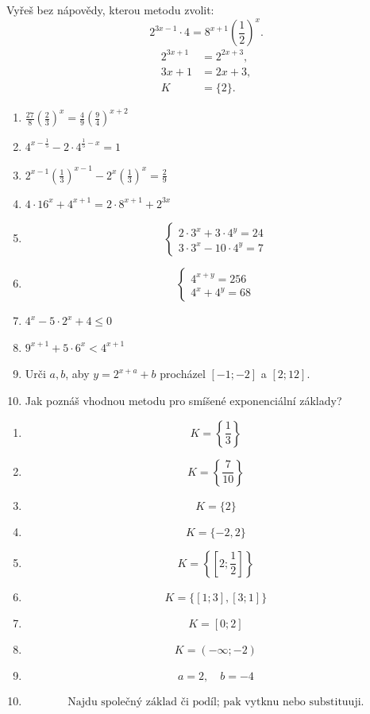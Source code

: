 \documentclass[11pt,a4paper]{article}
\begin{document}
\begin{prikladReseniBox}[title={Příklad 5}]
Vyřeš bez nápovědy, kterou metodu zvolit:
\[
2^{3x-1}\cdot4=8^{x+1}\left(\frac{1}{2}\right)^x.
\]
\tcblower
\[
\begin{aligned}2^{3x+1}&=2^{2x+3},\\3x+1&=2x+3,\\K&=\{2\}.\end{aligned}\]
\end{prikladReseniBox}

\begin{zadaniReseniBox}[title={Samostatná práce 1}]
\begin{enumerate}[label=\alph*)]
\item $\frac{27}{8}\left(\frac{2}{3}\right)^x=\frac{4}{9}\left(\frac{9}{4}\right)^{x+2}$
\item $4^{x-\frac{1}{5}}-2\cdot4^{\frac{1}{5}-x}=1$
\item $2^{x-1}\left(\frac{1}{3}\right)^{x-1}-2^x\left(\frac{1}{3}\right)^x=\frac{2}{9}$
\item $4\cdot16^x+4^{x+1}=2\cdot8^{x+1}+2^{3x}$
\item \[
\begin{cases}2\cdot3^x+3\cdot4^y=24\\3\cdot3^x-10\cdot4^y=7\end{cases}
\]
\item \[\begin{cases}4^{x+y}=256\\4^x+4^y=68\end{cases}\]
\item $4^x-5\cdot2^x+4\le0$
\item $9^{x+1}+5\cdot6^x<4^{x+1}$
\item Urči $a,b$, aby $y=2^{x+a}+b$ procházel $[-1;-2]$ a $[2;12]$.
\item Jak poznáš vhodnou metodu pro smíšené exponenciální základy?
\end{enumerate}
\tcblower
\begin{enumerate}[label=\alph*)]
\item \[
K=\left\{\frac{1}{3}\right\}
\]
\item \[
K=\left\{\frac{7}{10}\right\}
\]
\item \[
K=\{2\}
\]
\item \[
K=\{-2,2\}
\]
\item \[
K=\left\{\left[2;\frac{1}{2}\right]\right\}
\]
\item \[K=\{[1;3],[3;1]\}\]
\item \[
K=[0;2]
\]
\item \[
K=(-\infty;-2)
\]
\item \[
a=2,\quad b=-4
\]
\item \[
\text{Najdu společný základ či podíl; pak vytknu nebo substituuji.}
\]
\end{enumerate}
\end{zadaniReseniBox}
\end{document}
